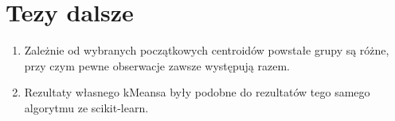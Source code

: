 \documentclass[12pt]{article}
\begin{document}
\section {Tezy dalsze}
\begin{enumerate}
	\item Zależnie od wybranych początkowych centroidów powstałe grupy są różne, przy czym pewne obserwacje zawsze występują razem.
	\item Rezultaty własnego kMeansa były podobne do rezultatów tego samego algorytmu ze scikit-learn.
\end{enumerate}
\end{document}
